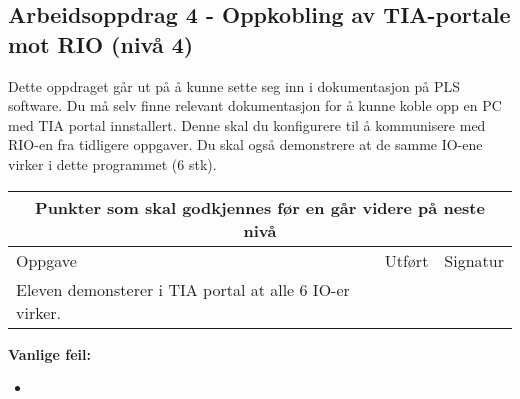 \subsection*{Arbeidsoppdrag 4 - Oppkobling av TIA-portale mot RIO (nivå 4)}

Dette oppdraget går ut på å kunne sette seg inn i dokumentasjon på PLS software. Du må selv finne relevant dokumentasjon for å kunne koble opp en PC med TIA portal innstallert. Denne skal du konfigurere til å kommunisere med RIO-en fra tidligere oppgaver. Du skal også demonstrere at de samme IO-ene virker i dette programmet (6 stk).


\begin{center}
\begin{tabular}{ | m{8cm} | m{1cm}| m{2cm} | } 
\hline
\multicolumn{3}{|c|}{Punkter som skal godkjennes før en går videre på neste nivå} \\
	\hline
	Oppgave	& Utført & Signatur \\ 
	\hline
Eleven demonsterer i TIA portal at alle 6 IO-er virker. & & \\ 
	\hline
\end{tabular}
\end{center}
\textbf{Vanlige feil:}
\begin{itemize}[noitemsep]
	\item 
\end{itemize}
\newpage




